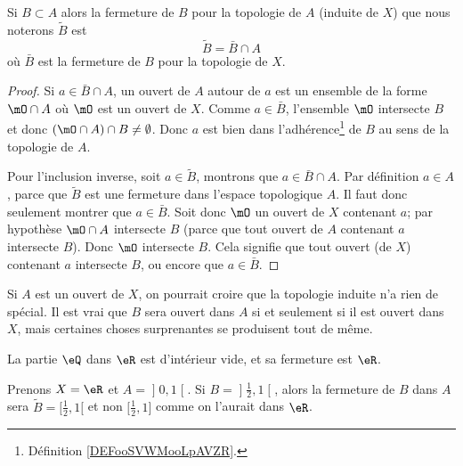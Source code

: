 \begin{lemma}       \label{LemkUYkQt}
	Si \( B\subset A\) alors la fermeture de \( B\) pour la topologie de \( A\) (induite de \( X\)) que nous noterons \( \tilde B\) est
	\begin{equation}
		\tilde B=\bar B\cap A
	\end{equation}
	où \( \bar B\) est la fermeture de \( B\) pour la topologie de \( X\).
\end{lemma}

\begin{proof}
	Si \( a\in \bar B\cap A\), un ouvert de \( A\) autour de \( a\) est un ensemble de la forme \( \mO\cap A\) où \( \mO\) est un ouvert de \( X\). Comme \( a\in\bar B\), l'ensemble \( \mO\) intersecte \( B\) et donc \( (\mO\cap A)\cap B\neq \emptyset\). Donc \( a\) est bien dans l'adhérence\footnote{Définition \ref{DEFooSVWMooLpAVZR}.} de \( B\) au sens de la topologie de \( A\).

	Pour l'inclusion inverse, soit \( a\in \tilde  B\), montrons que \( a\in \bar B\cap A\). Par définition \( a\in A\), parce que \( \tilde B\) est une fermeture dans l'espace topologique \( A\). Il faut donc seulement montrer que \( a\in\bar B\). Soit donc \( \mO\) un ouvert de \( X\) contenant \( a\); par hypothèse \( \mO\cap A\) intersecte \( B\) (parce que tout ouvert de \( A\) contenant \( a\) intersecte \( B\)). Donc \( \mO\) intersecte \( B\). Cela signifie que tout ouvert (de \( X\)) contenant \( a\) intersecte \( B\), ou encore que \( a\in \bar B\).
\end{proof}

Si \( A\) est un ouvert de \( X\), on pourrait croire que la topologie induite n'a rien de spécial. Il est vrai que \( B\) sera ouvert dans \( A\) si et seulement si il est ouvert dans \( X\), mais certaines choses surprenantes se produisent tout de même.

\begin{lemma}       \label{LEMooIGQCooOrroHT}
    La partie \( \eQ\) dans \( \eR\) est d'intérieur vide, et sa fermeture est \( \eR\).
\end{lemma}

\begin{example} \label{ExloeyoR}
	Prenons \( X=\eR\) et \( A=\mathopen] 0 , 1 \mathclose[\). Si \( B=\mathopen] \frac{ 1 }{2} , 1 \mathclose[ \), alors la fermeture de \( B\) dans \( A\) sera \( \tilde B=\mathopen[ \frac{ 1 }{2} , 1 [\) et non \( \mathopen[ \frac{ 1 }{2} , 1 \mathclose]\) comme on l'aurait dans \( \eR\).
\end{example}

